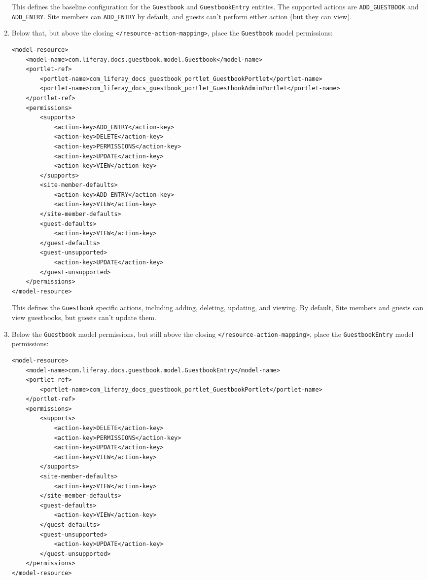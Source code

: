 \begin{enumerate}
  This defines the baseline configuration for the \texttt{Guestbook} and
  \texttt{GuestbookEntry} entities. The supported actions are
  \texttt{ADD\_GUESTBOOK} and \texttt{ADD\_ENTRY}. Site members can
  \texttt{ADD\_ENTRY} by default, and guests can't perform either action
  (but they can view).
\item
  Below that, but above the closing
  \texttt{\textless{}/resource-action-mapping\textgreater{}}, place the
  \texttt{Guestbook} model permissions:

\begin{verbatim}
<model-resource>
    <model-name>com.liferay.docs.guestbook.model.Guestbook</model-name>
    <portlet-ref>
        <portlet-name>com_liferay_docs_guestbook_portlet_GuestbookPortlet</portlet-name>
        <portlet-name>com_liferay_docs_guestbook_portlet_GuestbookAdminPortlet</portlet-name>
    </portlet-ref>
    <permissions>
        <supports>
            <action-key>ADD_ENTRY</action-key>
            <action-key>DELETE</action-key>
            <action-key>PERMISSIONS</action-key>
            <action-key>UPDATE</action-key>
            <action-key>VIEW</action-key>
        </supports>
        <site-member-defaults>
            <action-key>ADD_ENTRY</action-key>
            <action-key>VIEW</action-key>
        </site-member-defaults>
        <guest-defaults>
            <action-key>VIEW</action-key>
        </guest-defaults>
        <guest-unsupported>
            <action-key>UPDATE</action-key>
        </guest-unsupported>
    </permissions>
</model-resource>
\end{verbatim}

  This defines the \texttt{Guestbook} specific actions, including
  adding, deleting, updating, and viewing. By default, Site members and
  guests can view guestbooks, but guests can't update them.
\item
  Below the \texttt{Guestbook} model permissions, but still above the
  closing \texttt{\textless{}/resource-action-mapping\textgreater{}},
  place the \texttt{GuestbookEntry} model permissions:

\begin{verbatim}
<model-resource>
    <model-name>com.liferay.docs.guestbook.model.GuestbookEntry</model-name>
    <portlet-ref>
        <portlet-name>com_liferay_docs_guestbook_portlet_GuestbookPortlet</portlet-name>
    </portlet-ref>
    <permissions>
        <supports>
            <action-key>DELETE</action-key>
            <action-key>PERMISSIONS</action-key>
            <action-key>UPDATE</action-key>
            <action-key>VIEW</action-key>
        </supports>
        <site-member-defaults>
            <action-key>VIEW</action-key>
        </site-member-defaults>
        <guest-defaults>
            <action-key>VIEW</action-key>
        </guest-defaults>
        <guest-unsupported>
            <action-key>UPDATE</action-key>
        </guest-unsupported>
    </permissions>
</model-resource>
\end{verbatim}


\end{enumerate}
